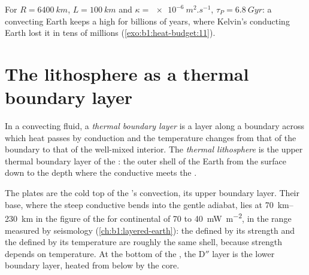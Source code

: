 For $R = \qty{6400}{km}$, $L = \qty{100}{km}$ and $\kappa =
\qty{e-6}{m^2.s^{-1}}$, $\tau_P = \qty{6.8}{Gyr}$: a convecting Earth keeps a
high  for billions of years, where Kelvin's conducting Earth lost it
in tens of millions (\cref{exo:b1:heat-budget:11}).

\section{The lithosphere as a thermal boundary layer}\label{sec:b1:heat-budget:boundary-layer}

\begin{definition}\label{def:b1:heat-budget:boundary-layer}
In a convecting fluid, a \emph{thermal boundary layer} is a layer along a boundary across which heat passes by conduction and
the temperature changes from that of the boundary to that of the well-mixed
interior. The \emph{thermal lithosphere} is the upper
thermal boundary layer of the : the outer shell of the Earth from the
surface down to the depth where the conductive  meets the .
\end{definition}

The plates are the cold top of the 's convection, its upper boundary
layer. Their base, where the steep conductive  bends into the gentle
adiabat, lies at \qtyrange{70}{230}{km} in the figure of the 
for continental  of 70 to \qty{40}{mW.m^{-2}}, in the range measured
by seismology (\cref{ch:b1:layered-earth}): the  defined by its
strength and the  defined by its temperature are roughly the same
shell, because strength depends on temperature. At the bottom of the , the
D$''$ layer is the lower boundary layer, heated from below by the core.

